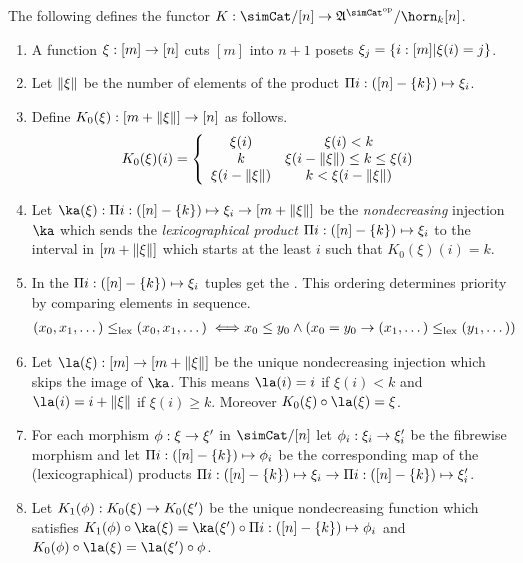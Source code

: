 \documentclass[csh.tex]{subfiles}
\begin{document}
\begin{definition}
The following defines the functor $K\of\simCat/[n]\to\ambient\s/\horn_k[n]$.
\begin{enumerate}
\item A function $\xi:[m]\to[n]$ cuts $[m]$ into $n+1$ posets $\xi_j = \left\{i:[m]|\xi(i)=j\right\}$. 
\item Let $\Vert \xi \Vert$ be the number of elements of the product $\Pi i: ([n]-\left\{k\right\}) \mapsto \xi_i$. 
\item Define $K_0(\xi): [m+\Vert \xi \Vert]\to [n]$ as follows.
\[ 
	K_0(\xi)(i) = \left\{
		\begin{array}{cc}
			\xi(i) & \xi(i)<k \\
			k & \xi(i-\Vert \xi \Vert)\leq k \leq \xi(i)\\
			\xi(i-\Vert \xi \Vert) & k<\xi(i-\Vert \xi \Vert)
		\end{array}
	\right.
\]
\item Let $\ka(\xi)\of\product{i\of([n]-\set k)}{\xi_i} \to [m+\norm\xi]$ be the \emph{nondecreasing} injection $\ka$ which sends the \emph{lexicographical product} $\Pi i:([n]-\left\{k\right\}) \mapsto \xi_i$ to the interval in $[m+\Vert \xi \Vert]$ which starts at the least $i$ such that $K_0(\xi)(i)=k$.

\item In the  $\Pi i:([n]-\left\{k\right\}) \mapsto \xi_i$ tuples get the . This ordering determines priority by comparing elements in sequence.
\begin{align*} 
(x_0,x_1,\dotsc) \leq_{\rm lex} (x_0,x_1,\dotsc) \iff& x_0\leq y_0 \land (x_0=y_0 \to (x_1,\dotsc)\leq_{\rm lex}(y_1,\dotsc))
\end{align*}

\item Let $\la(\xi)\of[m]\to[m+\norm\xi]$ be the unique nondecreasing injection which skips the image of $\ka$. This means $\la(i)=i$ if $\xi(i)<k$ and $\la(i)=i+\norm\xi$ if $\xi(i)\geq k$. Moreover $K_0(\xi)\circ\la(\xi) = \xi$.
\item For each morphism $\phi:\xi\to\xi'$ in $\simCat/[n]$ let $\phi_i:\xi_i\to\xi'_i$ be the fibrewise morphism and let $\Pi i:([n]-\left\{k\right\}) \mapsto \phi_i$ be the corresponding map of the (lexicographical) products $\Pi i:([n]-\left\{k\right\}) \mapsto \xi_i\to\Pi i:([n]-\left\{k\right\}) \mapsto \xi'_i$.
\item Let $K_1(\phi): K_0(\xi)\to K_0(\xi')$ be the unique nondecreasing function which satisfies $K_1(\phi)\circ \ka(\xi) = \ka(\xi')\circ \product{i\of([n]-\set k)}{\phi_i}$ and $K_0(\phi)\circ \la(\xi) = \la(\xi')\circ \phi$.
\end{enumerate}


\end{definition}
\end{document}

